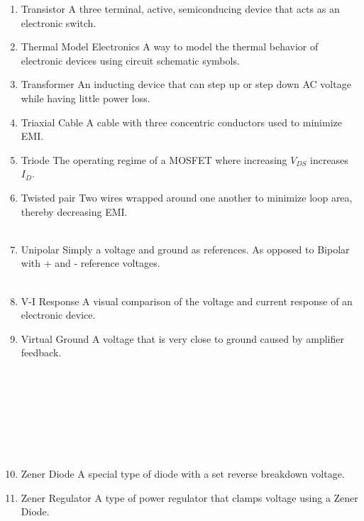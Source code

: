 \documentclass{IEEEtran}
\begin{document}
\begin{enumerate}
\\
\item Transistor
  \subitem A three terminal, active, semiconducing device that acts as an electronic switch.\\
\item Thermal Model Electronics
  \subitem A way to model the thermal behavior of electronic devices using circuit schematic symbols.\\
\item Transformer
  \subitem An inducting device that can step up or step down AC voltage while having little power loss. \\
\item Triaxial Cable
  \subitem A cable with three concentric conductors used to minimize EMI. \\ 
\item Triode
  \subitem The operating regime of a MOSFET where increasing $V_{DS}$ increases $I_D$.\\
\item Twisted pair
\subitem Two wires wrapped around one another to minimize loop area, thereby decreasing EMI. \\

\\
\item Unipolar
  \subitem Simply a voltage and ground as references. As opposed to Bipolar with + and - reference voltages. \\ 

\\
\item V-I Response
  \subitem A visual comparison of the voltage and current response of an electronic device.\\
\item Virtual Ground
  \subitem A voltage that is very close to ground caused by amplifier feedback. \\

\\
\\

\\
\\

\\
\\

\\
\item Zener Diode
  \subitem A special type of diode with a set reverse breakdown voltage.\\
\item Zener Regulator
  \subitem A type of power regulator that clamps voltage using a Zener Diode.\\
\end{enumerate}
\end{document}
